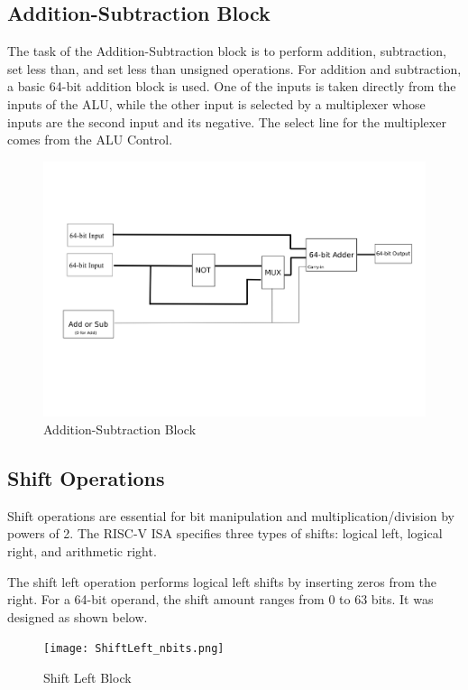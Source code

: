 \documentclass{article}
\begin{document}
\subsection*{Addition-Subtraction Block}

The task of the Addition-Subtraction block is to perform addition, subtraction, set less than, and set less than unsigned operations. For addition and subtraction, a basic 64-bit addition block is used. One of the inputs is taken directly from the inputs of the ALU, while the other input is selected by a multiplexer whose inputs are the second input and its negative. The select line for the multiplexer comes from the ALU Control.

\begin{figure}[H]
    \centering
    \includegraphics[width=\linewidth]{Addsub.png}
    \caption{Addition-Subtraction Block}
    \label{fig:addsub}
\end{figure}

\subsection*{Shift Operations}

Shift operations are essential for bit manipulation and multiplication/division by powers of 2. The RISC-V ISA specifies three types of shifts: logical left, logical right, and arithmetic right.

The shift left operation performs logical left shifts by inserting zeros from the right. For a 64-bit operand, the shift amount ranges from 0 to 63 bits. It was designed as shown below.

\begin{figure}[H]
    \centering
    \texttt{[image: ShiftLeft\_nbits.png]}
    \caption{Shift Left Block}
    \label{fig:shiftleft}
\end{figure}
\end{document}
